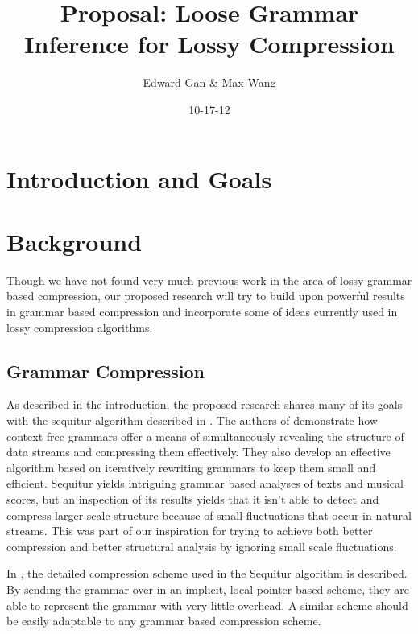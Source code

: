 \documentclass[11pt]{article}
\begin{document}


\title{Proposal: Loose Grammar Inference for Lossy Compression}
\author{Edward Gan \& Max Wang}
\date{10-17-12}
\maketitle

\section{Introduction and Goals}

\section{Background}

Though we have not found very much previous work in the area of lossy grammar
based compression, our proposed research will try to build upon powerful
results in grammar based compression and incorporate some of ideas currently
used in lossy compression algorithms.

\subsection{Grammar Compression}

As described in the introduction, the proposed research shares many of its
goals with the sequitur algorithm described in \cite{sequitur}. The authors of
\cite{sequitur} demonstrate how context free grammars offer a means of
simultaneously revealing the structure of data streams and compressing them
effectively. They also develop an effective algorithm based on iteratively
rewriting grammars to keep them small and efficient. Sequitur yields intriguing
grammar based analyses of texts and musical scores, but an inspection of its
results yields that it isn't able to detect and compress larger scale structure
because of small fluctuations that occur in natural streams. This was part of
our inspiration for trying to achieve both better compression and better
structural analysis by ignoring small scale fluctuations.

In \cite{sequitur2}, the detailed compression scheme used in the Sequitur
algorithm is described.  By sending the grammar over in an implicit,
local-pointer based scheme, they are able to represent the grammar with very
little overhead. A similar scheme should be easily adaptable to any grammar
based compression scheme.
\end{document}
